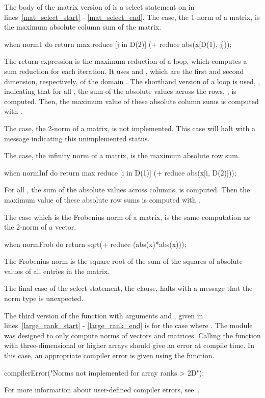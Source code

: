 The body of the matrix version of 
is a select statement on  in lines~\ref{mat_select_start} - \ref{mat_select_end}.
The  case, 
the 1-norm of a matrix, is the maximum absolute column sum of the matrix. 
\begin{chapel}
      when norm1 do           
        return max reduce [j in D(2)] (+ reduce abs(x[D(1), j])); 
\end{chapel}
The return expression is the maximum reduction of a  loop, which computes
a sum reduction for each iteration.  
It uses  and , which are the first and second dimension,
respectively, of the domain .  The shorthand version of a 
loop is used, \chpl{[j in D(2)]}, indicating that
for all , the sum
of the absolute values across the rows, , is computed. 
Then, the maximum value of these  absolute column sums is computed with
.  

The  case, the 2-norm of a matrix, is not
implemented.  This case will halt with a message indicating this unimplemented
status.  

The  case, the infinity norm of a matrix, is the maximum
absolute row sum.  
\begin{chapel}
      when normInf do  
        return max reduce [i in D(1)] (+ reduce abs(x[i, D(2)])); 
\end{chapel}
For all , the sum of the absolute values across columns,
 is computed.  Then the maximum value of these
 absolute row sums is computed with .  

The 
case which is the Frobenius norm of a matrix, is the same computation as the
2-norm of a vector.  
\begin{chapel}
      when normFrob do return sqrt(+ reduce (abs(x)*abs(x))); 
\end{chapel}
The Frobenius norm is the square root of the sum of the
squares of absolute values of all entries in the matrix.  

The final case of
the select statement, the  clause, halts with a message that
the norm type is unexpected.

The third version of the  function with arguments 
and , given in lines~\ref{large_rank_start} - \ref{large_rank_end} 
is for the case where .
The module was designed to only compute norms of vectors and matrices.  
Calling the  function with three-dimensional or higher arrays 
should give an error at compile time.  In this case, an appropriate compiler error 
is given using the  function.  
\begin{chapel}
    compilerError("Norms not implemented for array ranks > 2D"); 
\end{chapel}
For more information about 
user-defined compiler errors, see~.

